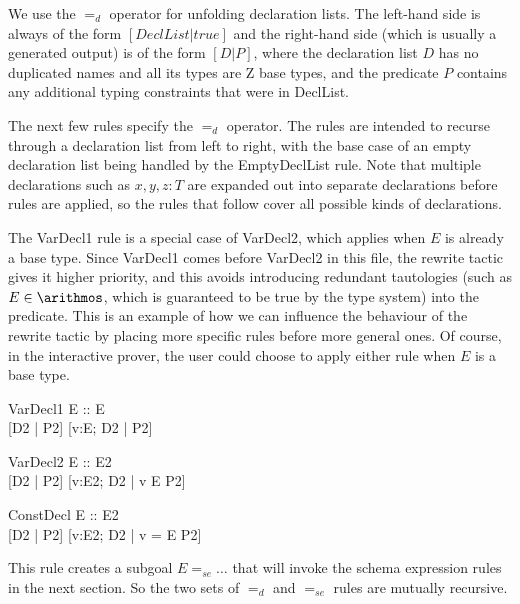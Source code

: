 \documentclass{article}
\newcommand{\sexprUnfoldsTo}{\mathrel{=_{se}}}
\newcommand{\declListUnfoldsTo}{\mathrel{=_d}}
\begin{document}
We use the $\declListUnfoldsTo$ operator for unfolding declaration
lists.   The left-hand side is always of the form $[DeclList|true]$
and the right-hand side (which is usually a generated output) is
of the form $[D|P]$, where the declaration list $D$ has no duplicated
names and all its types are Z base types, and the predicate $P$
contains any additional typing constraints that were in DeclList.

The next few rules specify the $\declListUnfoldsTo$ operator.
The rules are intended to recurse through a declaration list from left
to right, with the base case of an empty declaration list being handled
by the EmptyDeclList rule.  Note that multiple declarations such as
$x,y,z:T$ are expanded out into separate declarations before rules
are applied, so the rules that follow cover all possible kinds
of declarations.

The VarDecl1 rule is a special case of VarDecl2, which applies when $E$ is
already a base type.  Since VarDecl1 comes before VarDecl2 in this file,
the rewrite tactic gives it higher priority, and this avoids introducing
redundant tautologies (such as $E \in \arithmos$, which is guaranteed to
be true by the type system) into the predicate.  This is an example of
how we can influence the behaviour of the rewrite tactic by placing more
specific rules before more general ones.  Of course, in the interactive
prover, the user could choose to apply either rule when $E$ is a base type.

\begin{zedrule}{VarDecl1}
   E :: \power E \\
   [D1 | true] \declListUnfoldsTo [D2 | P2]
\derives
   [v:E; D1 | true] \declListUnfoldsTo [v:E; D2 |  P2]
\end{zedrule}

\begin{zedrule}{VarDecl2}
   E :: \power E2 \\
   [D1 | true] \declListUnfoldsTo [D2 | P2]
\derives
   [v:E; D1 | true] \declListUnfoldsTo [v:E2; D2 |  v \in E \land P2]
\end{zedrule}

\begin{zedrule}{ConstDecl}
   E :: E2 \\
   [D1 | true] \declListUnfoldsTo [D2 | P2]
\derives
   [v==E; D1 | true] \declListUnfoldsTo [v:E2; D2 |  v = E \land P2]
\end{zedrule}

This rule creates a subgoal $E \sexprUnfoldsTo \ldots$ that will
invoke the schema expression rules in the next section.  So the
two sets of $\declListUnfoldsTo$ and $\sexprUnfoldsTo$ rules are
mutually recursive.
\end{document}
